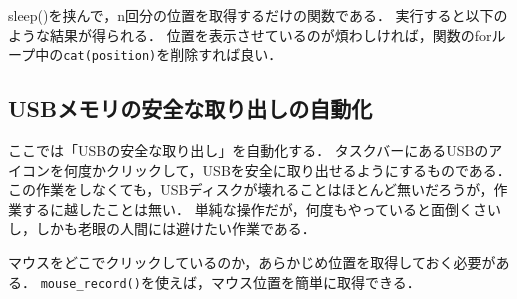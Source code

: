 \documentclass[
]{article}
\newenvironment{Shaded}{\begin{snugshade}}{\end{snugshade}}
\newcommand{\AttributeTok}[1]{\textcolor[rgb]{0.77,0.63,0.00}{#1}}
\newcommand{\DecValTok}[1]{\textcolor[rgb]{0.00,0.00,0.81}{#1}}
\newcommand{\DocumentationTok}[1]{\textcolor[rgb]{0.56,0.35,0.01}{\textbf{\textit{#1}}}}
\newcommand{\FunctionTok}[1]{\textcolor[rgb]{0.00,0.00,0.00}{#1}}
\newcommand{\NormalTok}[1]{#1}
\newcommand{\OtherTok}[1]{\textcolor[rgb]{0.56,0.35,0.01}{#1}}
\newcommand{\SpecialCharTok}[1]{\textcolor[rgb]{0.00,0.00,0.00}{#1}}
\begin{document}
sleep()を挟んで，n回分の位置を取得するだけの関数である．
実行すると以下のような結果が得られる．
位置を表示させているのが煩わしければ，関数のforループ中の\texttt{cat(position)}を削除すれば良い．

\begin{Shaded}
\end{Shaded}

\hypertarget{usbux30e1ux30e2ux30eaux306eux5b89ux5168ux306aux53d6ux308aux51faux3057ux306eux81eaux52d5ux5316}{%
\subsection{USBメモリの安全な取り出しの自動化}\label{usbux30e1ux30e2ux30eaux306eux5b89ux5168ux306aux53d6ux308aux51faux3057ux306eux81eaux52d5ux5316}}

ここでは「USBの安全な取り出し」を自動化する．
タスクバーにあるUSBのアイコンを何度かクリックして，USBを安全に取り出せるようにするものである．
この作業をしなくても，USBディスクが壊れることはほとんど無いだろうが，作業するに越したことは無い．
単純な操作だが，何度もやっていると面倒くさいし，しかも老眼の人間には避けたい作業である．

マウスをどこでクリックしているのか，あらかじめ位置を取得しておく必要がある．
\texttt{mouse\_record()}を使えば，マウス位置を簡単に取得できる．

\begin{Shaded}
\end{Shaded}
\end{document}

